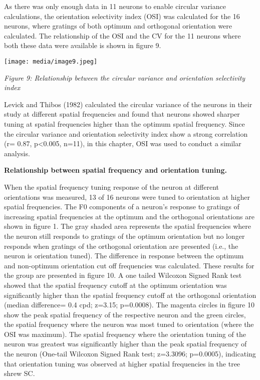 As there was only enough data in 11 neurons to enable circular variance
calculations, the orientation selectivity index (OSI) was calculated for
the 16 neurons, where gratings of both optimum and orthogonal
orientation were calculated. The relationship of the OSI and the CV for
the 11 neurons where both these data were available is shown in figure
9.

\texttt{[image: media/image9.jpeg]}

\emph{Figure 9: Relationship between the circular variance and
orientation selectivity index}

Levick and Thibos (1982) calculated the circular variance of the neurons
in their study at different spatial frequencies and found that neurons
showed sharper tuning at spatial frequencies higher than the optimum
spatial frequency. Since the circular variance and orientation
selectivity index show a strong correlation (r= 0.87, p\textless{}0.005,
n=11), in this chapter, OSI was used to conduct a similar analysis.

\textbf{Relationship between spatial frequency and orientation tuning.}

When the spatial frequency tuning response of the neuron at different
orientations was measured, 13 of 16 neurons were tuned to orientation at
higher spatial frequencies. The F0 components of a neuron's response to
gratings of increasing spatial frequencies at the optimum and the
orthogonal orientations are shown in figure 1. The gray shaded area
represents the spatial frequencies where the neuron still responds to
gratings of the optimum orientation but no longer responds when gratings
of the orthogonal orientation are presented (i.e., the neuron is
orientation tuned). The difference in response between the optimum and
non-optimum orientation cut off frequencies was calculated. These
results for the group are presented in figure 10. A one tailed Wilcoxon
Signed Rank test showed that the spatial frequency cutoff at the optimum
orientation was significantly higher than the spatial frequency cutoff
at the orthogonal orientation (median difference= 0.4 cpd; z=3.15;
p=0.0008). The magenta circles in figure 10 show the peak spatial
frequency of the respective neuron and the green circles, the spatial
frequency where the neuron was most tuned to orientation (where the OSI
was maximum). The spatial frequency where the orientation tuning of the
neuron was greatest was significantly higher than the peak spatial
frequency of the neuron (One-tail Wilcoxon Signed Rank test; z=3.3096;
p=0.0005), indicating that orientation tuning was observed at higher
spatial frequencies in the tree shrew SC.

